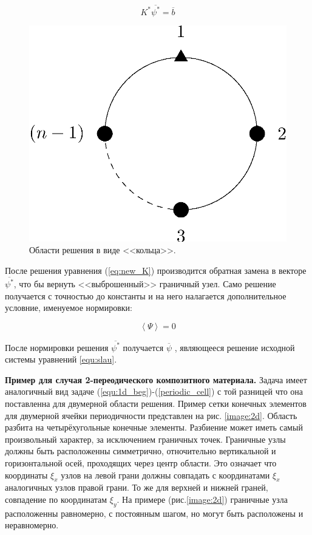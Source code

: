 \begin{equation}
    K^* \overline{\psi^*} = \overline{b}
    \label{eq:new_K}  
\end{equation}

\begin{figure} [ht]
    \center
    \includegraphics [scale=0.8] {images/1d_loop}
    \caption{Области решения в виде <<кольца>>.} 
    \label{images:1d_loop}  
\end{figure}

После решения уравнения (\ref{eq:new_K}) производится обратная замена в векторе $\overline{\psi^*}$, что бы вернуть <<выброшенный>> граничный узел. 
Само решение получается с точностью до константы и на него налагается дополнительное условние, именуемое нормировки:

\begin{equation}
    \left< \Psi \right> = 0
\end{equation}

После нормировки решения $ \overline{\psi^*} $ получается $ \overline{\psi} $ , являющееся решение исходной системы уравнений \ref{equ:slau}. 

\textbf{Пример для случая 2-переодического композитного материала.} 
Задача имеет аналогичный вид задаче (\ref{equ:1d_beg})-(\ref{periodic_cell}) с той разницей что она поставленна для двумерной области решения. 
Пример сетки конечных элементов для двумерной ячейки периодичности представлен на рис. \ref{image:2d}.
Область разбита на четырёхугольные конечные элементы. 
Разбиение может иметь самый произвольный характер, за исключением граничных точек.
Граничные узлы должны быть расположенны симметрично, отночительно вертикальной и горизонтальной осей, проходящих через центр области.
Это означает что координаты $\xi_x$ узлов на левой грани должны совпадать с координатами $\xi_x$ аналогичных узлов правой грани.
То же для верхней и нижней граней, совпадение по координатам $\xi_y$.
На примере (рис.\ref{image:2d}) граничные узла расположенны равномерно, с постоянным шагом, но могут быть расположены и неравномерно.

